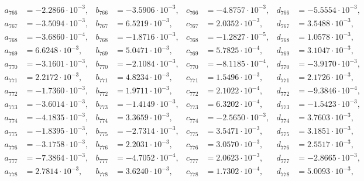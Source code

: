 \begin{align*}
  a_{ 766 } &= -2.2866 \cdot 10^{ -3 }, & b_{ 766 } &= -3.5906 \cdot 10^{ -3 }, & c_{ 766 } &= -4.8757 \cdot 10^{ -3 }, & d_{ 766 } &= -5.5554 \cdot 10^{ -3 }, \\ 
  a_{ 767 } &= -3.5094 \cdot 10^{ -3 }, & b_{ 767 } &= 6.5219 \cdot 10^{ -3 }, & c_{ 767 } &= 2.0352 \cdot 10^{ -3 }, & d_{ 767 } &= 3.5488 \cdot 10^{ -3 }, \\ 
  a_{ 768 } &= -3.6860 \cdot 10^{ -4 }, & b_{ 768 } &= -1.8716 \cdot 10^{ -3 }, & c_{ 768 } &= -1.2827 \cdot 10^{ -5 }, & d_{ 768 } &= 1.0578 \cdot 10^{ -3 }, \\ 
  a_{ 769 } &= 6.6248 \cdot 10^{ -3 }, & b_{ 769 } &= 5.0471 \cdot 10^{ -3 }, & c_{ 769 } &= 5.7825 \cdot 10^{ -4 }, & d_{ 769 } &= 3.1047 \cdot 10^{ -3 }, \\ 
  a_{ 770 } &= -3.1601 \cdot 10^{ -3 }, & b_{ 770 } &= -2.1084 \cdot 10^{ -3 }, & c_{ 770 } &= -8.1185 \cdot 10^{ -4 }, & d_{ 770 } &= -3.9170 \cdot 10^{ -3 }, \\ 
  a_{ 771 } &= 2.2172 \cdot 10^{ -3 }, & b_{ 771 } &= 4.8234 \cdot 10^{ -3 }, & c_{ 771 } &= 1.5496 \cdot 10^{ -3 }, & d_{ 771 } &= 2.1726 \cdot 10^{ -3 }, \\ 
  a_{ 772 } &= -1.7360 \cdot 10^{ -3 }, & b_{ 772 } &= 1.9711 \cdot 10^{ -3 }, & c_{ 772 } &= 2.1022 \cdot 10^{ -4 }, & d_{ 772 } &= -9.3846 \cdot 10^{ -4 }, \\ 
  a_{ 773 } &= -3.6014 \cdot 10^{ -3 }, & b_{ 773 } &= -1.4149 \cdot 10^{ -3 }, & c_{ 773 } &= 6.3202 \cdot 10^{ -4 }, & d_{ 773 } &= -1.5423 \cdot 10^{ -3 }, \\ 
  a_{ 774 } &= -4.1835 \cdot 10^{ -3 }, & b_{ 774 } &= 3.3659 \cdot 10^{ -3 }, & c_{ 774 } &= -2.5650 \cdot 10^{ -3 }, & d_{ 774 } &= 3.7603 \cdot 10^{ -3 }, \\ 
  a_{ 775 } &= -1.8395 \cdot 10^{ -3 }, & b_{ 775 } &= -2.7314 \cdot 10^{ -3 }, & c_{ 775 } &= 3.5471 \cdot 10^{ -3 }, & d_{ 775 } &= 3.1851 \cdot 10^{ -3 }, \\ 
  a_{ 776 } &= -3.1758 \cdot 10^{ -3 }, & b_{ 776 } &= 2.2031 \cdot 10^{ -3 }, & c_{ 776 } &= 3.0570 \cdot 10^{ -3 }, & d_{ 776 } &= 2.5517 \cdot 10^{ -3 }, \\ 
  a_{ 777 } &= -7.3864 \cdot 10^{ -3 }, & b_{ 777 } &= -4.7052 \cdot 10^{ -4 }, & c_{ 777 } &= 2.0623 \cdot 10^{ -3 }, & d_{ 777 } &= -2.8665 \cdot 10^{ -3 }, \\ 
  a_{ 778 } &= 2.7814 \cdot 10^{ -3 }, & b_{ 778 } &= 3.6240 \cdot 10^{ -3 }, & c_{ 778 } &= 1.7302 \cdot 10^{ -4 }, & d_{ 778 } &= 5.0093 \cdot 10^{ -3 }, \\ 

\end{align*}
